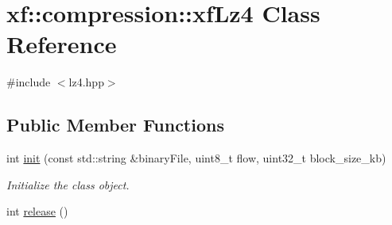 \hypertarget{classxf_1_1compression_1_1xfLz4}{\section{xf\-:\-:compression\-:\-:xf\-Lz4 Class Reference}
\label{classxf_1_1compression_1_1xfLz4}
}


{\ttfamily \#include $<$lz4.\-hpp$>$}

\subsection*{Public Member Functions}
\begin{DoxyCompactItemize}
\item 
int \hyperlink{classxf_1_1compression_1_1xfLz4_a842fe00ba79eb9301b37bb32c12c076f}{init} (const std\-::string \&binary\-File, uint8\-\_\-t flow, uint32\-\_\-t block\-\_\-size\-\_\-kb)
\begin{DoxyCompactList}\small\item\em Initialize the class object. \end{DoxyCompactList}\item 
\hypertarget{classxf_1_1compression_1_1xfLz4_a7b49cab9833b4c0fd72f0802b82f55dd}{int \hyperlink{classxf_1_1compression_1_1xfLz4_a7b49cab9833b4c0fd72f0802b82f55dd}{release} ()}\label{classxf_1_1compression_1_1xfLz4_a7b49cab9833b4c0fd72f0802b82f55dd}


\end{DoxyCompactItemize}
